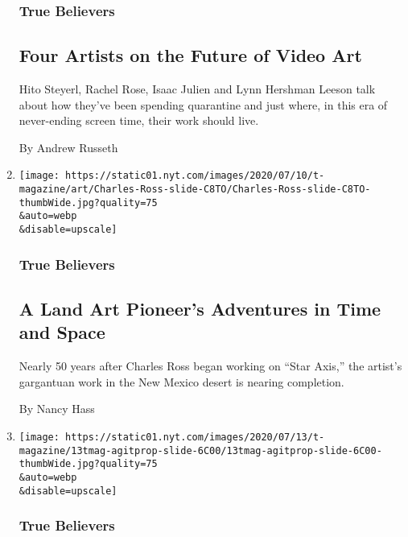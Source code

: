 \begin{enumerate}
  \hypertarget{true-believers-5}{%
  \subsubsection{True Believers}\label{true-believers-5}}

  \hypertarget{four-artists-on-the-future-of-video-art}{%
  \subsection{Four Artists on the Future of Video
  Art}\label{four-artists-on-the-future-of-video-art}}

  Hito Steyerl, Rachel Rose, Isaac Julien and Lynn Hershman Leeson talk
  about how they've been spending quarantine and just where, in this era
  of never-ending screen time, their work should live.

  By Andrew Russeth
\item
  \href{/2020/07/21/t-magazine/charles-ross-artist.html}{}

  \texttt{[image: https://static01.nyt.com/images/2020/07/10/t-magazine/art/Charles-Ross-slide-C8TO/Charles-Ross-slide-C8TO-thumbWide.jpg?quality=75\\\&auto=webp\\\&disable=upscale]}

  \hypertarget{true-believers-6}{%
  \subsubsection{True Believers}\label{true-believers-6}}

  \hypertarget{a-land-art-pioneers-adventures-in-time-and-space}{%
  \subsection{A Land Art Pioneer's Adventures in Time and
  Space}\label{a-land-art-pioneers-adventures-in-time-and-space}}

  Nearly 50 years after Charles Ross began working on ``Star Axis,'' the
  artist's gargantuan work in the New Mexico desert is nearing
  completion.

  By Nancy Hass
\item
  \href{/2020/07/21/t-magazine/art-financial-crisis.html}{}

  \texttt{[image: https://static01.nyt.com/images/2020/07/13/t-magazine/13tmag-agitprop-slide-6C00/13tmag-agitprop-slide-6C00-thumbWide.jpg?quality=75\\\&auto=webp\\\&disable=upscale]}

  \hypertarget{true-believers-7}{%
  \subsubsection{True Believers}\label{true-believers-7}}


\end{enumerate}
